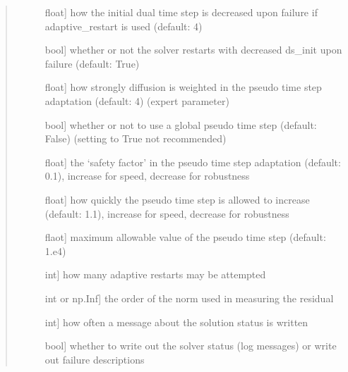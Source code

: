 \documentclass[letterpaper,10pt,english]{sphinxmanual}
\begin{document}
\begin{fulllineitems}
\begin{fulllineitems}
\begin{quote}
\begin{description}
\begin{description}
\item[{}] \leavevmode{[}float{]}
how the initial dual time step is decreased upon failure if adaptive\_restart is used (default: 4)

\item[{}] \leavevmode{[}bool{]}
whether or not the solver restarts with decreased ds\_init upon failure (default: True)

\item[{}] \leavevmode{[}float{]}
how strongly diffusion is weighted in the pseudo time step adaptation (default: 4) (expert parameter)

\item[{}] \leavevmode{[}bool{]}
whether or not to use a global pseudo time step (default: False) (setting to True not recommended)

\item[{}] \leavevmode{[}float{]}
the ‘safety factor’ in the pseudo time step adaptation (default: 0.1), increase for speed, decrease for robustness

\item[{}] \leavevmode{[}float{]}
how quickly the pseudo time step is allowed to increase (default: 1.1), increase for speed, decrease for robustness

\item[{}] \leavevmode{[}flaot{]}
maximum allowable value of the pseudo time step (default: 1.e4)

\item[{}] \leavevmode{[}int{]}
how many adaptive restarts may be attempted

\item[{}] \leavevmode{[}int or np.Inf{]}
the order of the norm used in measuring the residual

\item[{}] \leavevmode{[}int{]}
how often a message about the solution status is written

\item[{}] \leavevmode{[}bool{]}
whether to write out the solver status (log messages) or write out failure descriptions

\end{description}


\end{description}
\end{quote}
\end{fulllineitems}
\end{fulllineitems}
\end{document}
